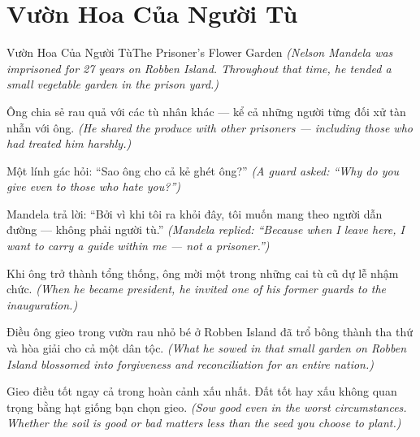 \section{Vườn Hoa Của Người Tù}
\begin{truyen}{Vườn Hoa Của Người Tù}{The Prisoner's Flower Garden}
\textit{(Nelson Mandela was imprisoned for 27 years on Robben Island. Throughout that time, he tended a small vegetable garden in the prison yard.)}

Ông chia sẻ rau quả với các tù nhân khác — kể cả những người từng đối xử tàn nhẫn với ông.
\textit{(He shared the produce with other prisoners — including those who had treated him harshly.)}

Một lính gác hỏi: ``Sao ông cho cả kẻ ghét ông?''
\textit{(A guard asked: ``Why do you give even to those who hate you?'')}

Mandela trả lời: ``Bởi vì khi tôi ra khỏi đây, tôi muốn mang theo người dẫn đường — không phải người tù.''
\textit{(Mandela replied: ``Because when I leave here, I want to carry a guide within me — not a prisoner.'')}

Khi ông trở thành tổng thống, ông mời một trong những cai tù cũ dự lễ nhậm chức.
\textit{(When he became president, he invited one of his former guards to the inauguration.)}

Điều ông gieo trong vườn rau nhỏ bé ở Robben Island đã trổ bông thành tha thứ và hòa giải cho cả một dân tộc.
\textit{(What he sowed in that small garden on Robben Island blossomed into forgiveness and reconciliation for an entire nation.)}

\end{truyen}

\begin{baihoc}
Gieo điều tốt ngay cả trong hoàn cảnh xấu nhất. Đất tốt hay xấu không quan trọng bằng hạt giống bạn chọn gieo.
\textit{(Sow good even in the worst circumstances. Whether the soil is good or bad matters less than the seed you choose to plant.)}
\end{baihoc}
\ngancach

